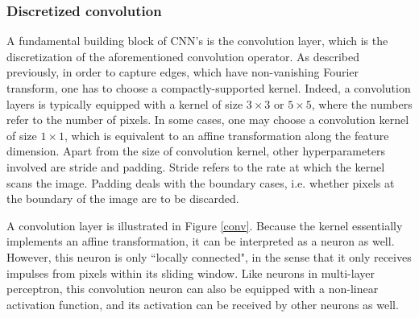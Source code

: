 \documentclass{article}
\begin{document}
\subsubsection{Discretized convolution}

A fundamental building block of CNN's is the convolution layer, which is the discretization of the aforementioned convolution operator.
As described previously, in order to capture edges, which have non-vanishing Fourier transform, one has to choose a compactly-supported kernel.
Indeed, a convolution layers is typically equipped with a kernel of size $3 \times 3$ or $5 \times 5$, where the numbers refer to the number of pixels.
In some cases, one may choose a convolution kernel of size $1 \times 1$, which is equivalent to an affine transformation along the feature dimension.
Apart from the size of convolution kernel, other hyperparameters involved are stride and padding.
Stride refers to the rate at which the kernel scans the image.
Padding deals with the boundary cases, i.e. whether pixels at the boundary of the image are to be discarded.

A convolution layer is illustrated in Figure \ref{conv}.
Because the kernel essentially implements an affine transformation, it can be interpreted as a neuron as well.
However, this neuron is only ``locally connected", in the sense that it only receives impulses from pixels within its sliding window.
Like neurons in multi-layer perceptron, this convolution neuron can also be equipped with a non-linear activation function, and its activation can be received by other neurons as well.
\end{document}
